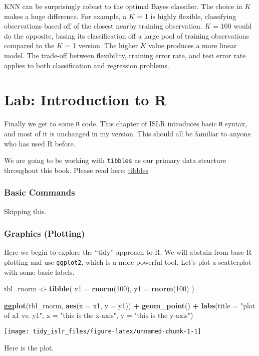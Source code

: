 \documentclass[]{book}
\newenvironment{Shaded}{\begin{snugshade}}{\end{snugshade}}
\newcommand{\KeywordTok}[1]{\textcolor[rgb]{0.13,0.29,0.53}{\textbf{#1}}}
\newcommand{\DataTypeTok}[1]{\textcolor[rgb]{0.13,0.29,0.53}{#1}}
\newcommand{\DecValTok}[1]{\textcolor[rgb]{0.00,0.00,0.81}{#1}}
\newcommand{\StringTok}[1]{\textcolor[rgb]{0.31,0.60,0.02}{#1}}
\newcommand{\OperatorTok}[1]{\textcolor[rgb]{0.81,0.36,0.00}{\textbf{#1}}}
\newcommand{\NormalTok}[1]{#1}
\theoremstyle{definition}
\theoremstyle{definition}
\theoremstyle{definition}
\theoremstyle{remark}
\begin{document}
KNN can be surprisingly robust to the optimal Bayes classifier. The
choice in \(K\) makes a huge difference. For example, a \(K\) = 1 is
highly flexible, classifying observations based off of the closest
nearby training observation. \(K\) = 100 would do the opposite, basing
its classification off a large pool of training observations compared to
the \(K\) = 1 version. The higher \(K\) value produces a more linear
model. The trade-off between flexibility, training error rate, and test
error rate applies to both classification and regression problems.

\section{Lab: Introduction to R}\label{lab-introduction-to-r}

Finally we get to some \texttt{R} code. This chapter of ISLR introduces
basic \texttt{R} syntax, and most of it is unchanged in my version. This
should all be familiar to anyone who has used R before.

We are going to be working with \texttt{tibbles} as our primary data
structure throughout this book. Please read here:
\href{http://r4ds.had.co.nz/tibbles.html}{tibbles}

\subsubsection{Basic Commands}\label{basic-commands}

Skipping this.

\subsubsection{Graphics (Plotting)}\label{graphics-plotting}

Here we begin to explore the ``tidy'' approach to R. We will abstain
from base R plotting and use \texttt{ggplot2}, which is a more powerful
tool. Let's plot a scatterplot with some basic labels.

\begin{Shaded}
\begin{Highlighting}[]
\NormalTok{tbl_rnorm <-}\StringTok{ }\KeywordTok{tibble}\NormalTok{(}
  \DataTypeTok{x1 =} \KeywordTok{rnorm}\NormalTok{(}\DecValTok{100}\NormalTok{),}
  \DataTypeTok{y1 =} \KeywordTok{rnorm}\NormalTok{(}\DecValTok{100}\NormalTok{)}
\NormalTok{)}

\KeywordTok{ggplot}\NormalTok{(tbl_rnorm, }\KeywordTok{aes}\NormalTok{(}\DataTypeTok{x =}\NormalTok{ x1, }\DataTypeTok{y =}\NormalTok{ y1)) }\OperatorTok{+}\StringTok{ }
\StringTok{  }\KeywordTok{geom_point}\NormalTok{() }\OperatorTok{+}\StringTok{ }
\StringTok{  }\KeywordTok{labs}\NormalTok{(}\DataTypeTok{title =} \StringTok{"plot of x1 vs. y1"}\NormalTok{,}
       \DataTypeTok{x =} \StringTok{"this is the x-axis"}\NormalTok{,}
       \DataTypeTok{y =} \StringTok{"this is the y-axis"}\NormalTok{)}
\end{Highlighting}
\end{Shaded}

\begin{center}\texttt{[image: tidy\_islr\_files/figure-latex/unnamed-chunk-1-1]} \end{center}

Here is the plot.
\end{document}
